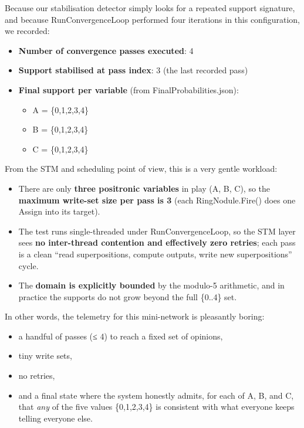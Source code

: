 \documentclass[a4paper,11pt]{article}
\begin{document}
Because our stabilisation detector simply looks for a repeated support signature, and because RunConvergenceLoop performed four iterations in this configuration, we recorded:

\begin{itemize}
\item
  \textbf{Number of convergence passes executed}: 4
\item
  \textbf{Support stabilised at pass index}: 3 (the last recorded pass)
\item
  \textbf{Final support per variable} (from FinalProbabilities.json):

  \begin{itemize}
  \item
    A = \{0,1,2,3,4\}
  \item
    B = \{0,1,2,3,4\}
  \item
    C = \{0,1,2,3,4\}
  \end{itemize}
\end{itemize}

From the STM and scheduling point of view, this is a very gentle workload:

\begin{itemize}
\item
  There are only \textbf{three positronic variables} in play (A, B, C), so the \textbf{maximum write-set size per pass is 3} (each RingNodule.Fire() does one Assign into its target).
\item
  The test runs single-threaded under RunConvergenceLoop, so the STM layer sees \textbf{no inter-thread contention and effectively zero retries}; each pass is a clean ``read superpositions, compute outputs, write new superpositions'' cycle.
\item
  The \textbf{domain is explicitly bounded} by the modulo-5 arithmetic, and in practice the supports do not grow beyond the full \{0..4\} set.
\end{itemize}

In other words, the telemetry for this mini-network is pleasantly boring:

\begin{itemize}
\item
  a handful of passes (≤ 4) to reach a fixed set of opinions,
\item
  tiny write sets,
\item
  no retries,
\item
  and a final state where the system honestly admits, for each of A, B, and C, that \emph{any} of the five values \{0,1,2,3,4\} is consistent with what everyone keeps telling everyone else.
\end{itemize}
\end{document}
